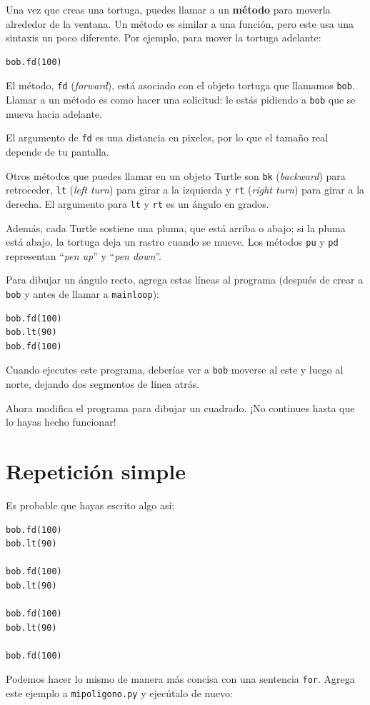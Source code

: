 \documentclass[10pt]{book}
\begin{document}
Una vez que creas una tortuga, puedes llamar a un {\bf método} para moverla
alrededor de la ventana.  Un método es similar a una función, pero
este usa una sintaxis un poco diferente.  Por ejemplo, para mover la tortuga
adelante:

\begin{verbatim}
bob.fd(100)
\end{verbatim}
%
El método, {\tt fd} ({\em forward}), está asociado con el objeto
tortuga que llamamos {\tt bob}.
Llamar a un método es como hacer una solicitud: le estás pidiendo a {\tt bob}
que se mueva hacia adelante.

El argumento de {\tt fd} es una distancia en pixeles, por lo que el tamaño
real depende de tu pantalla.

Otros métodos que puedes llamar en un objeto Turtle son {\tt bk} ({\em backward}) para
retroceder, {\tt lt} ({\em left turn}) para girar a la izquierda y {\tt rt} ({\em right turn}) para girar a la derecha.  El
argumento para {\tt lt} y {\tt rt} es un ángulo en grados.

Además, cada Turtle sostiene una pluma, que está
arriba o abajo; si la pluma está abajo, la tortuga deja
un rastro cuando se mueve.  Los métodos {\tt pu} y {\tt pd}
representan ``{\em pen up}'' y ``{\em pen down}''.

Para dibujar un ángulo recto, agrega estas líneas al programa
(después de crear a {\tt bob} y antes de llamar a \verb"mainloop"):

\begin{verbatim}
bob.fd(100)
bob.lt(90)
bob.fd(100)
\end{verbatim}
%
Cuando ejecutes este programa, deberías ver a {\tt bob} moverse al este y luego
al norte, dejando dos segmentos de línea atrás.

Ahora modifica el programa para dibujar un cuadrado.  ¡No continues hasta que
lo hayas hecho funcionar!


\section{Repetición simple}
\label{repetition}

Es probable que hayas escrito algo así:

\begin{verbatim}
bob.fd(100)
bob.lt(90)

bob.fd(100)
bob.lt(90)

bob.fd(100)
bob.lt(90)

bob.fd(100)
\end{verbatim}
%
Podemos hacer lo mismo de manera más concisa con una sentencia {\tt for}.
Agrega este ejemplo a {\tt mipoligono.py} y ejecútalo de nuevo:
\end{document}
